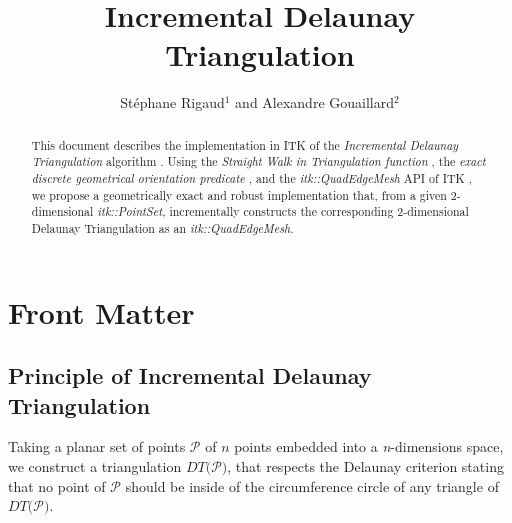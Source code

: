 \documentclass{InsightArticle}
\title{Incremental Delaunay Triangulation}
\author{St\'{e}phane Rigaud$^{1}$ and Alexandre Gouaillard$^{2}$}
\newcommand{\IJhandlerIDnumber}{1338}  %
\begin{document}
%
% 
\IJhandlefooter{\IJhandlerIDnumber}


\ifpdf
\else
\fi


\maketitle


\ifhtml
\chapter*{Front Matter\label{front}}
\fi


\begin{abstract}
\noindent
This document describes the implementation in ITK of the \emph{Incremental Delaunay Triangulation} algorithm \cite{Devillers1998}. Using the \emph{Straight Walk in Triangulation function} \cite{Rigaud2012}, the \emph{exact discrete geometrical orientation predicate} \cite{Moreau2011},  and the \emph{itk::QuadEdgeMesh} API \cite{Gouaillard2006} of ITK , we propose a geometrically exact and robust implementation that, from a given 2-dimensional \emph{itk::PointSet}, incrementally constructs the corresponding 2-dimensional Delaunay Triangulation as an \emph{itk::QuadEdgeMesh}.

\end{abstract}

\IJhandlenote{\IJhandlerIDnumber}

\tableofcontents
\vfil
\section{Principle of Incremental Delaunay Triangulation}

Taking a planar set of points $\mathcal{P}$ of $\mathit{n}$ points embedded into a \emph{n}-dimensions space, we construct a triangulation $\mathit{DT(}\mathcal{P}\mathit{)}$, that respects the Delaunay criterion stating that no point of $\mathcal{P}$ should be inside of the circumference circle of any triangle of $\mathit{DT(}\mathcal{P}\mathit{)}$.\\
\end{document}
